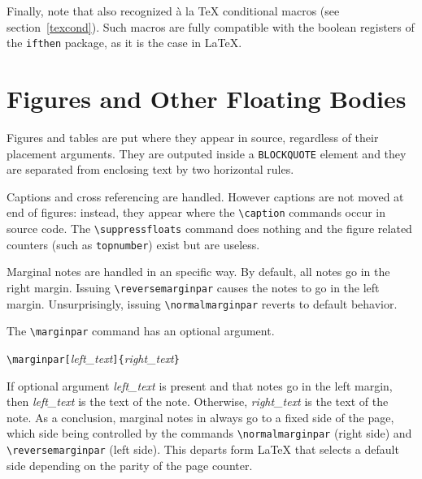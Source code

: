 Finally, note that \hevea{} also recognized \`a la \TeX{} conditional
macros (see section~\ref{texcond}). Such macros are fully compatible
with the boolean registers of the \texttt{ifthen} package, as it is
the case in \LaTeX.


\section{Figures and Other Floating Bodies}

Figures and tables are put where they appear in source, regardless of
their placement arguments.
They are outputed  inside a \verb+BLOCKQUOTE+ element and they are
separated from enclosing text by two
horizontal rules.

Captions and cross referencing are handled.
However captions are not moved at end of figures: instead, they appear
where the \verb+\caption+ commands occur in source code.
The \verb+\suppressfloats+ command does nothing and the
figure related counters (such as \verb+topnumber+) exist but are useless.

%
%
%
\reversemarginpar%
\normalmarginpar%
Marginal notes are handled in an \hevea{} specific way.
By default, all notes go in the right margin.
Issuing \verb+\reversemarginpar+ causes the notes to go in the left
margin. Unsurprisingly, issuing \verb+\normalmarginpar+ reverts to
default behavior.

The \verb+\marginpar+ command has an optional argument.
\begin{flushleft}
\quad\verb+\marginpar[+\textit{left\_text}\verb+]{+\textit{right\_text}\verb+}+
\end{flushleft}
If optional argument \textit{left\_text} is present and that notes
go in the left margin, then \textit{left\_text} is the text of the
note. Otherwise, \textit{right\_text} is the text of the note.
As a conclusion, marginal notes in \hevea{} always go to a fixed side
of the page, which side being controlled by the commands
\verb+\normalmarginpar+ (right side) and \verb+\reversemarginpar+
(left side). This departs form \LaTeX{} that selects a default side
depending on the parity of the page counter.

